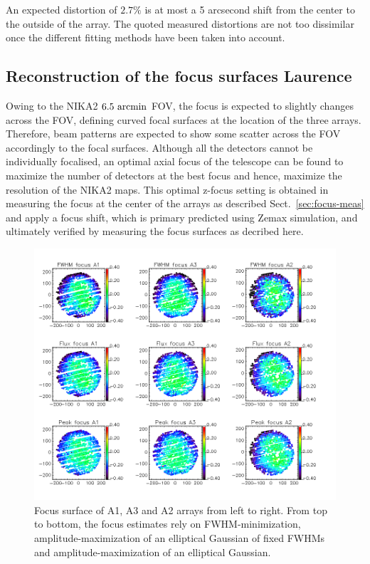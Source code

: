 An expected distortion of $2.7\%$ is at most a 5 arcsecond shift from the
center to the outside of the array.  The quoted measured distortions are not
too dissimilar once the different fitting methods have been taken into
account.



\subsection{Reconstruction of the focus surfaces {\color{blue} Laurence} }
\label{sec:focus_surfaces}

Owing to the NIKA2 $6.5~\rm{arcmin}$ FOV, the focus is expected to
slightly changes across the FOV, defining curved focal surfaces at the
location of the three arrays. Therefore, beam patterns are expected to
show some scatter across the FOV accordingly to the focal
surfaces. Although all the detectors cannot be individually focalised,
an optimal axial focus of the telescope can be found to maximize the
number of detectors at the best focus and hence, maximize the
resolution of the NIKA2 maps.
This optimal z-focus setting is obtained
in measuring the focus at the center of the arrays as described
Sect.~\ref{sec:focus-meas} and apply a focus shift, which is primary
predicted using Zemax simulation, and ultimately verified by measuring
the focus surfaces as decribed here.

\begin{figure}
\begin{center}
  \includegraphics[trim={0, 1cm, 0, 1cm}, clip, angle=0, scale=0.5]{Figures/fov_focus_mv_5.png}
\caption[Focus surfaces]{Focus surface of A1, A3 and A2 arrays from left to
  right. From top to bottom, the focus estimates rely on
  FWHM-minimization, amplitude-maximization of an elliptical
  Gaussian of fixed FWHMs and amplitude-maximization of an elliptical
  Gaussian.}
\label{fig:focus-surfaces}
\end{center}
\end{figure}

